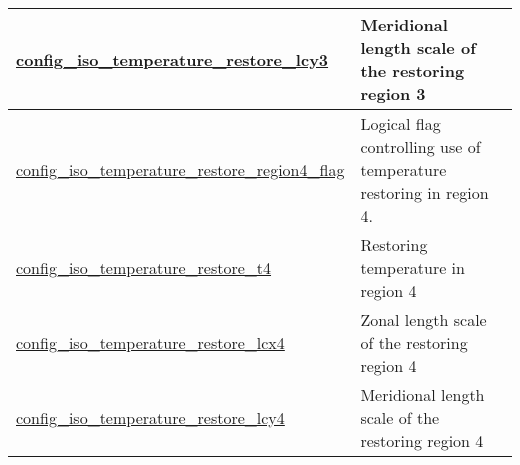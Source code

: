 {\begin{center}
\begin{longtable}{| p{2.0in} || p{4.0in} |}
    \hline
    \hyperref[subsec:nm_sec_config_iso_temperature_restore_lcy3]{config\_iso\_temperature\_\-restore\_lcy3} & Meridional length scale of the restoring region 3 \\
    \hline
    \hyperref[subsec:nm_sec_config_iso_temperature_restore_region4_flag]{config\_iso\_temperature\_\-restore\_region4\_flag} & Logical flag controlling use of temperature restoring in region 4. \\
    \hline
    \hyperref[subsec:nm_sec_config_iso_temperature_restore_t4]{config\_iso\_temperature\_\-restore\_t4} & Restoring temperature in region 4 \\
    \hline
    \hyperref[subsec:nm_sec_config_iso_temperature_restore_lcx4]{config\_iso\_temperature\_\-restore\_lcx4} & Zonal length scale of the restoring region 4 \\
    \hline
    \hyperref[subsec:nm_sec_config_iso_temperature_restore_lcy4]{config\_iso\_temperature\_\-restore\_lcy4} & Meridional length scale of the restoring region 4 \\
    \hline
\end{longtable}
\end{center}
}
